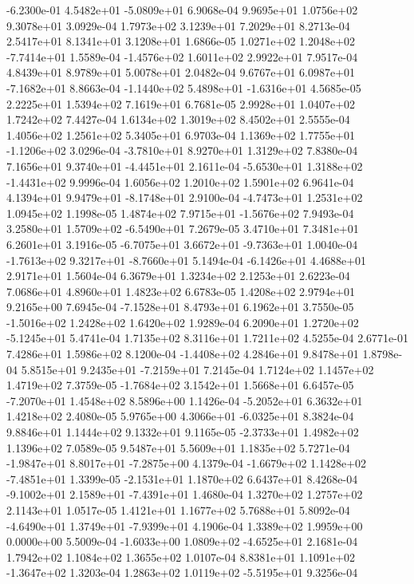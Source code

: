 -6.2300e-01  4.5482e+01 -5.0809e+01  6.9068e-04
9.9695e+01 1.0756e+02 9.3078e+01  3.0929e-04
1.7973e+02 3.1239e+01 7.2029e+01  8.2713e-04
2.5417e+01 8.1341e+01 3.1208e+01  1.6866e-05
 1.0271e+02  1.2048e+02 -7.7414e+01  1.5589e-04
-1.4576e+02  1.6011e+02  2.9922e+01  7.9517e-04
4.8439e+01 8.9789e+01 5.0078e+01  2.0482e-04
 9.6767e+01  6.0987e+01 -7.1682e+01  8.8663e-04
-1.1440e+02  5.4898e+01 -1.6316e+01  4.5685e-05
2.2225e+01 1.5394e+02 7.1619e+01  6.7681e-05
2.9928e+01 1.0407e+02 1.7242e+02  7.4427e-04
1.6134e+02 1.3019e+02 8.4502e+01  2.5555e-04
1.4056e+02 1.2561e+02 5.3405e+01  6.9703e-04
 1.1369e+02  1.7755e+01 -1.1206e+02  3.0296e-04
-3.7810e+01  8.9270e+01  1.3129e+02  7.8380e-04
 7.1656e+01  9.3740e+01 -4.4451e+01  2.1611e-04
-5.6530e+01  1.3188e+02 -1.4431e+02  9.9996e-04
1.6056e+02 1.2010e+02 1.5901e+02  6.9641e-04
 4.1394e+01  9.9479e+01 -8.1748e+01  2.9100e-04
-4.7473e+01  1.2531e+02  1.0945e+02  1.1998e-05
 1.4874e+02  7.9715e+01 -1.5676e+02  7.9493e-04
 3.2580e+01  1.5709e+02 -6.5490e+01  7.2679e-05
3.4710e+01 7.3481e+01 6.2601e+01  3.1916e-05
-6.7075e+01  3.6672e+01 -9.7363e+01  1.0040e-04
-1.7613e+02  9.3217e+01 -8.7660e+01  5.1494e-04
-6.1426e+01  4.4688e+01  2.9171e+01  1.5604e-04
6.3679e+01 1.3234e+02 2.1253e+01  2.6223e-04
7.0686e+01 4.8960e+01 1.4823e+02  6.6783e-05
1.4208e+02 2.9794e+01 9.2165e+00  7.6945e-04
-7.1528e+01  8.4793e+01  6.1962e+01  3.7550e-05
-1.5016e+02  1.2428e+02  1.6420e+02  1.9289e-04
 6.2090e+01  1.2720e+02 -5.1245e+01  5.4741e-04
1.7135e+02 8.3116e+01 1.7211e+02  4.5255e-04
2.6771e-01 7.4286e+01 1.5986e+02  8.1200e-04
-1.4408e+02  4.2846e+01  9.8478e+01  1.8798e-04
 5.8515e+01  9.2435e+01 -7.2159e+01  7.2145e-04
1.7124e+02 1.1457e+02 1.4719e+02  7.3759e-05
-1.7684e+02  3.1542e+01  1.5668e+01  6.6457e-05
-7.2070e+01  1.4548e+02  8.5896e+00  1.1426e-04
-5.2052e+01  6.3632e+01  1.4218e+02  2.4080e-05
 5.9765e+00  4.3066e+01 -6.0325e+01  8.3824e-04
9.8846e+01 1.1444e+02 9.1332e+01  9.1165e-05
-2.3733e+01  1.4982e+02  1.1396e+02  7.0589e-05
9.5487e+01 5.5609e+01 1.1835e+02  5.7271e-04
-1.9847e+01  8.8017e+01 -7.2875e+00  4.1379e-04
-1.6679e+02  1.1428e+02 -7.4851e+01  1.3399e-05
-2.1531e+01  1.1870e+02  6.6437e+01  8.4268e-04
-9.1002e+01  2.1589e+01 -7.4391e+01  1.4680e-04
1.3270e+02 1.2757e+02 2.1143e+01  1.0517e-05
1.4121e+01 1.1677e+02 5.7688e+01  5.8092e-04
-4.6490e+01  1.3749e+01 -7.9399e+01  4.1906e-04
1.3389e+02 1.9959e+00 0.0000e+00  5.5009e-04
-1.6033e+00  1.0809e+02 -4.6525e+01  2.1681e-04
1.7942e+02 1.1084e+02 1.3655e+02  1.0107e-04
 8.8381e+01  1.1091e+02 -1.3647e+02  1.3203e-04
 1.2863e+02  1.0119e+02 -5.5195e+01  9.3256e-04
